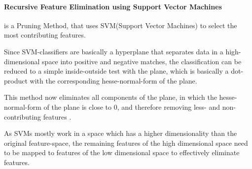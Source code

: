 \paragraph{Recursive Feature Elimination using Support Vector Machines}
\label{par:methods.flat.embedded.svm}


is a Pruning Method, that uses SVM(Support Vector Machines) to select the most
contributing features.

Since SVM-classifiers are basically a hyperplane that separates data in a
high-dimensional space into positive and negative matches, the classification
can be reduced to a simple inside-outside test with the plane, which is basically
a dot-product with the corresponding hesse-normal-form of the plane.

This method now eliminates all components of the plane, in which the
hesse-normal-form of the plane is close to $0$, and therefore removing
less- and non-contributing features \cite{Brank:02}.

As SVMs mostly work in a space which has a higher dimensionality than the
original feature-space, the remaining features of the high dimensional space
need to be mapped to features of the low dimensional space to effectively
eliminate features.